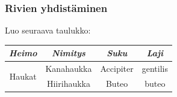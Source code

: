 \begin{frame}[fragile]
    \frametitle{Rivien yhdistäminen} 
    \begin{harj}\label{taulukko}
        Luo seuraava taulukko: 
        \begin{table}
            \begin{serif}
                \begin{tabular}{|c|c|c|c|}
                    \hline
                    \textit{Heimo} & \textit{Nimitys} & \textit{Suku} & \textit{Laji}\\ \hline
                    \multirow{2}{*}{Haukat} & Kanahaukka & Accipiter &  gentilis\\ \cline{2-4}
                                            & Hiirihaukka & Buteo & buteo\\ \hline
                \end{tabular}
            \end{serif}
        \end{table}
    \end{harj}
\end{frame}
